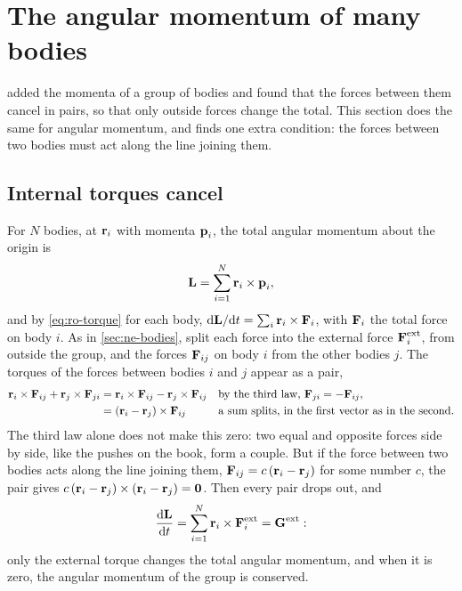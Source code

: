 \section{The angular momentum of many bodies}
\label{sec:ro-system}

 added the momenta of a group of bodies and found that
the forces between them cancel in pairs, so that only outside forces change
the total. This section does the same for angular momentum, and finds one
extra condition: the forces between two bodies must act along the line
joining them.

\subsection*{Internal torques cancel}

For $N$ bodies, at $\bm{\mathrm{r}}_i$ with momenta $\bm{\mathrm{p}}_i$, the total angular
momentum about the origin is
\begin{equation*}
   \bm{\mathrm{L}} = \sum_{i=1}^{N}\bm{\mathrm{r}}_i\times\bm{\mathrm{p}}_i ,
\end{equation*}
and by \cref{eq:ro-torque} for each body, $\mathrm{d}\bm{\mathrm{L}}/\mathrm{d} t = \sum_i\bm{\mathrm{r}}_i
\times\bm{\mathrm{F}}_i$, with $\bm{\mathrm{F}}_i$ the total force on body $i$. As in
\cref{sec:ne-bodies}, split each force into the external force
$\bm{\mathrm{F}}_i^{\mathrm{ext}}$, from outside the group, and the forces
$\bm{\mathrm{F}}_{ij}$ on body $i$ from the other bodies $j$. The torques of the forces between bodies $i$ and $j$ appear as a
pair,
\begin{align*}
   \bm{\mathrm{r}}_i\times\bm{\mathrm{F}}_{ij} + \bm{\mathrm{r}}_j\times\bm{\mathrm{F}}_{ji}
   &= \bm{\mathrm{r}}_i\times\bm{\mathrm{F}}_{ij} - \bm{\mathrm{r}}_j\times\bm{\mathrm{F}}_{ij}
   && \text{by the third law, $\bm{\mathrm{F}}_{ji} = -\bm{\mathrm{F}}_{ij}$,}\\
   &= (\bm{\mathrm{r}}_i - \bm{\mathrm{r}}_j)\times\bm{\mathrm{F}}_{ij}
   && \text{a sum splits, in the first vector as in the second.}
\end{align*}
The third law alone does not make this zero: two equal and opposite
forces side by side, like the pushes on the book, form a couple. But if
the force between two bodies acts along the line joining them,
$\bm{\mathrm{F}}_{ij} = c\,(\bm{\mathrm{r}}_i - \bm{\mathrm{r}}_j)$ for some number $c$, the pair
gives $c\,(\bm{\mathrm{r}}_i - \bm{\mathrm{r}}_j)\times(\bm{\mathrm{r}}_i - \bm{\mathrm{r}}_j) = \bm{\mathrm{0}}$. Then
every pair drops out, and
\begin{equation}
   \frac{\mathrm{d}\bm{\mathrm{L}}}{\mathrm{d} t} = \sum_{i=1}^{N}\bm{\mathrm{r}}_i\times
   \bm{\mathrm{F}}_i^{\mathrm{ext}} = \bm{\mathrm{G}}^{\mathrm{ext}} :
   \label{eq:ro-system}
\end{equation}
only the external torque changes the total angular momentum, and when it is
zero, the angular momentum of the group is conserved.

